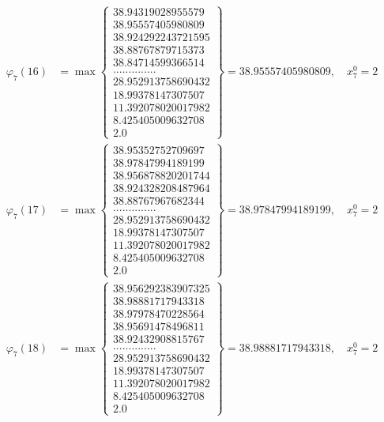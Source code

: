 \documentclass{article}
\begin{document}
\begin{align*}
  
  
  
\varphi_{7}(16) &= \max \left\{ \begin{array}{c}
38.94319028955579 \\
 38.95557405980809 \\
 38.924292243721595 \\
 38.88767879715373 \\
 38.84714599366514 \\
 .............. \\
 28.952913758690432 \\
 18.99378147307507 \\
 11.392078020017982 \\
 8.425405009632708 \\
 2.0
\end{array} \right\} = 38.95557405980809, \quad x_{7}^0 = 2\\
  
  
  
  
\varphi_{7}(17) &= \max \left\{ \begin{array}{c}
38.95352752709697 \\
 38.97847994189199 \\
 38.956878820201744 \\
 38.924328208487964 \\
 38.88767967682344 \\
 .............. \\
 28.952913758690432 \\
 18.99378147307507 \\
 11.392078020017982 \\
 8.425405009632708 \\
 2.0
\end{array} \right\} = 38.97847994189199, \quad x_{7}^0 = 2\\
  
  
  
  
\varphi_{7}(18) &= \max \left\{ \begin{array}{c}
38.956292383907325 \\
 38.98881717943318 \\
 38.97978470228564 \\
 38.95691478496811 \\
 38.92432908815767 \\
 .............. \\
 28.952913758690432 \\
 18.99378147307507 \\
 11.392078020017982 \\
 8.425405009632708 \\
 2.0
\end{array} \right\} = 38.98881717943318, \quad x_{7}^0 = 2\\
  

\end{align*}
\end{document}
